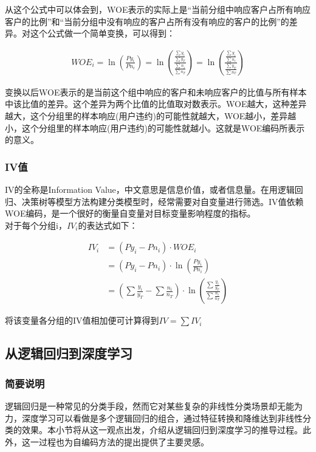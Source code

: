 从这个公式中可以体会到，WOE表示的实际上是“当前分组中响应客户占所有响应客户的比例”和“当前分组中没有响应的客户占所有没有响应的客户的比例”的差异。对这个公式做一个简单变换，可以得到：

\begin{equation}
    \begin{aligned}
        WOE_i = \ln(\frac{Py_i}{Pn_i})=\ln(\frac{\frac{\sum y_i}{\sum y_T}}{\frac{\sum n_i}{\sum n_T}})=\ln(\frac{\frac{\sum y_i}{\sum n_i}}{\frac{\sum y_T}{\sum n_T}})
    \end{aligned}
\end{equation}

变换以后WOE表示的是当前这个组中响应的客户和未响应客户的比值与所有样本中该比值的差异。这个差异为两个比值的比值取对数表示。WOE越大，这种差异越大，这个分组里的样本响应(用户违约)的可能性就越大，WOE越小，差异越小，这个分组里的样本响应(用户违约)的可能性就越小。这就是WOE编码所表示的意义。

\subsubsection{IV值}

IV的全称是Information Value，中文意思是信息价值，或者信息量。在用逻辑回归、决策树等模型方法构建分类模型时，经常需要对自变量进行筛选。IV值依赖WOE编码，是一个很好的衡量自变量对目标变量影响程度的指标。\\

对于每个分组i，$IV_i$的表达式如下：

\begin{equation}
    \begin{aligned}
        IV_i & = (Py_i-Pn_i)\cdot WOE_i                                                                                  \\
             & = (Py_i - Pn_i)\cdot \ln(\frac{Py_i}{Pn_i})                                                               \\
             & =(\sum \frac{y_i}{y_T}-\sum \frac{n_i}{n_T}) \cdot \ln(\frac{\sum \frac{y_i}{y_T}}{\sum \frac{n_i}{n_T}})
    \end{aligned}
\end{equation}


将该变量各分组的IV值相加便可计算得到$IV=\sum IV_i$

\subsection{从逻辑回归到深度学习}
\subsubsection{简要说明}
逻辑回归\cite{rl}是一种常见的分类手段，然而它对某些复杂的非线性分类场景却无能为力，深度学习可以看做是多个逻辑回归的组合，通过特征转换和降维达到非线性分类的效果。本小节将从这一观点出发，介绍从逻辑回归到深度学习的推导过程。此外，这一过程也为自编码方法的提出提供了主要灵感。


